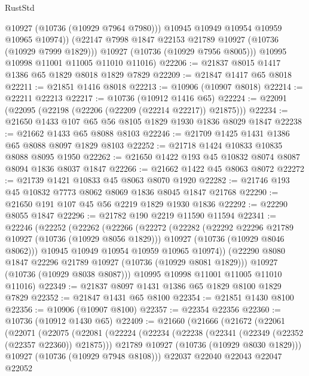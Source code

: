 \begin{lexlean}{RustStd}
\begin{coremodule}
              @10927
              (@10736 (@10929 @7964 @7980)))
            @10945
            @10949
            @10954
            @10959
            @10965
            @10974))
        (@22147 @7998 @1847 @22153 @21789 @10927 (@10736 (@10929 @7999 @1829)))
        @10927
        (@10736 (@10929 @7956 @8005)))
      @10995
      @10998
      @11001
      @11005
      @11010
      @11016)
@22206 := @21837 @8015 @1417 @1386 @65 @1829 @8018 @1829 @7829
@22209 := @21847 @1417 @65 @8018
@22211 := @21851 @1416 @8018
@22213 := @10906 (@10907 @8018)
@22214 := @22211 @22213
@22217 := @10736 (@10912 @1416 @65)
@22224 := @22091 (@22095 (@22198 (@22206 (@22209 (@22214 @22217)) @21875)))
@22234 := @21650 @1433 @107 @65 @56 @8105 @1829 @1930 @1836 @8029 @1847
@22238 := @21662 @1433 @65 @8088 @8103
@22246 := @21709 @1425 @1431 @1386 @65 @8088 @8097 @1829 @8103
@22252 := @21718 @1424 @10833 @10835 @8088 @8095 @1950
@22262 := @21650 @1422 @193 @45 @10832 @8074 @8087 @8094 @1836 @8037 @1847
@22266 := @21662 @1422 @45 @8063 @8072
@22272 := @21739 @1421 @10833 @45 @8063 @8070 @1920
@22282 := @21746 @193 @45 @10832 @7773 @8062 @8069 @1836 @8045 @1847 @21768
@22290 := @21650 @191 @107 @45 @56 @2219 @1829 @1930 @1836
@22292 := @22290 @8055 @1847
@22296 := @21782 @190 @2219 @11590 @11594
@22341 := @22246
    (@22252
      (@22262
        (@22266
          (@22272
            (@22282
              (@22292 @22296 @21789 @10927 (@10736 (@10929 @8056 @1829)))
              @10927
              (@10736 (@10929 @8046 @8062)))
            @10945
            @10949
            @10954
            @10959
            @10965
            @10974))
        (@22290 @8080 @1847 @22296 @21789 @10927 (@10736 (@10929 @8081 @1829)))
        @10927
        (@10736 (@10929 @8038 @8087)))
      @10995
      @10998
      @11001
      @11005
      @11010
      @11016)
@22349 := @21837 @8097 @1431 @1386 @65 @1829 @8100 @1829 @7829
@22352 := @21847 @1431 @65 @8100
@22354 := @21851 @1430 @8100
@22356 := @10906 (@10907 @8100)
@22357 := @22354 @22356
@22360 := @10736 (@10912 @1430 @65)
@22409 := @21660
    (@21666
      (@21672
        (@22061
          (@22071
            (@22075
              (@22081
                (@22224
                  (@22234
                    (@22238 (@22341 (@22349 (@22352 (@22357 @22360)) @21875)))
                    @21789
                    @10927
                    (@10736 (@10929 @8030 @1829)))
                  @10927
                  (@10736 (@10929 @7948 @8108)))
                @22037
                @22040
                @22043
                @22047
                @22052

\end{coremodule}
\end{lexlean}
